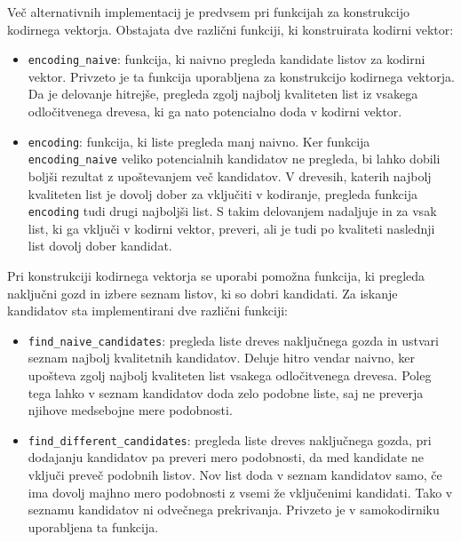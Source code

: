 \documentclass[12pt,a4paper]{article}
\begin{document}
Več alternativnih implementacij je predvsem pri funkcijah za konstrukcijo kodirnega vektorja.
Obstajata dve različni funkciji, ki konstruirata kodirni vektor:

\begin{itemize}
	\item \texttt{encoding\_naive}: funkcija, ki naivno pregleda kandidate listov za kodirni vektor. 
	Privzeto je ta funkcija uporabljena za konstrukcijo kodirnega vektorja. 
	Da je delovanje hitrejše, pregleda zgolj najbolj kvaliteten list iz vsakega odločitvenega drevesa, ki ga nato potencialno doda v kodirni vektor.

	\item \texttt{encoding}: funkcija, ki liste pregleda manj naivno.
	Ker funkcija \texttt{encoding\_naive} veliko potencialnih kandidatov ne pregleda, bi lahko dobili boljši rezultat z upoštevanjem več kandidatov.
	V drevesih, katerih najbolj kvaliteten list je dovolj dober za vključiti v kodiranje, pregleda funkcija \texttt{encoding} tudi drugi najboljši list.
	S takim delovanjem nadaljuje in za vsak list, ki ga vključi v kodirni vektor, preveri, ali je tudi po kvaliteti naslednji list dovolj dober kandidat.
\end{itemize}

Pri konstrukciji kodirnega vektorja se uporabi pomožna funkcija, ki pregleda naključni gozd in izbere seznam listov, ki so dobri kandidati.
Za iskanje kandidatov sta implementirani dve različni funkciji:

\begin{itemize}
	\item \texttt{find\_naive\_candidates}: pregleda liste dreves naključnega gozda in ustvari seznam najbolj kvalitetnih kandidatov.
	Deluje hitro vendar naivno, ker upošteva zgolj najbolj kvaliteten list vsakega odločitvenega drevesa.
	Poleg tega lahko v seznam kandidatov doda zelo podobne liste, saj ne preverja njihove medsebojne mere podobnosti.

	\item \texttt{find\_different\_candidates}: pregleda liste dreves naključnega gozda, 
	pri dodajanju kandidatov pa preveri mero podobnosti, da med kandidate ne vključi preveč podobnih listov.
	Nov list doda v seznam kandidatov samo, če ima dovolj majhno mero podobnosti z vsemi že vključenimi kandidati.
	Tako v seznamu kandidatov ni odvečnega prekrivanja. Privzeto je v samokodirniku uporabljena ta funkcija.
\end{itemize}
\end{document}
